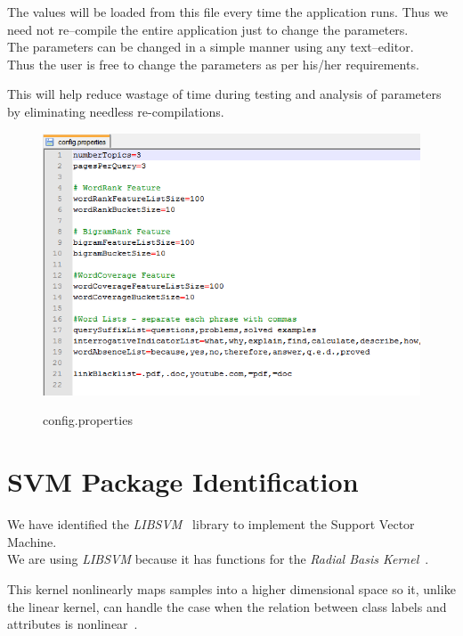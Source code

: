 \documentclass[a4paper,10pt]{report}
\begin{document}
\noindent The values will be loaded from this file every time the application runs. Thus we need not re--compile the entire application just to change the parameters. \\

\noindent The parameters can be changed in a simple manner using any text--editor. \\

\noindent Thus the user is free to change the parameters as per his/her requirements. 

This will help reduce wastage of time during testing and analysis of parameters by eliminating needless re-compilations.

\begin{figure}[h!]
\centering
\includegraphics[width=\textwidth]{./diagrams/config}\\
\caption{config.properties}
\end{figure}

\clearpage


\chapter{SVM Package Identification}

We have identified the \emph{LIBSVM}~\cite{libsvm} library to implement the Support Vector Machine. \\

\noindent We are using \emph{LIBSVM} because it has functions for the \emph{Radial Basis Kernel}~\cite{libsvmpaper}. 

This kernel nonlinearly maps samples into a higher dimensional space so it, unlike the linear kernel, can handle the case when the relation between class labels and attributes is nonlinear~\cite{libsvmpaper}.\\
\end{document}
